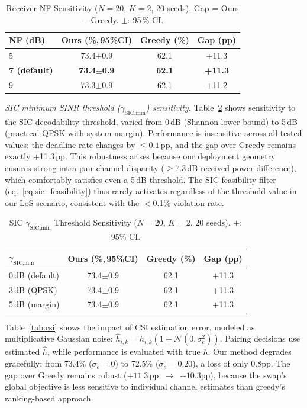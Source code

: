 \documentclass[journal]{IEEEtran}
\begin{document}
\begin{table}[h]
\centering
\caption{Receiver NF Sensitivity ($N=20$, $K=2$, 20 seeds). Gap = Ours $-$ Greedy. $\pm$: 95\,\% CI.}
\label{tab:nf}
\small
\begin{tabular}{lccc}
\toprule
NF (dB) & Ours (\%,\,95\%CI) & Greedy (\%) & Gap (pp) \\
\midrule
5 & 73.4$\pm$0.9 & 62.1 & +11.3 \\
\textbf{7 (default)} & \textbf{73.4$\pm$0.9} & \textbf{62.1} & \textbf{+11.3} \\
9 & 73.3$\pm$0.9 & 62.1 & +11.2 \\
\bottomrule
\end{tabular}
\end{table}

\emph{SIC minimum SINR threshold ($\gamma_{\text{SIC,min}}$) sensitivity.}
Table~\ref{tab:sic_threshold} shows sensitivity to the SIC decodability threshold, varied from 0\,dB (Shannon lower bound) to 5\,dB (practical QPSK with system margin).
Performance is insensitive across all tested values: the deadline rate changes by $\leq 0.1$\,pp, and the gap over Greedy remains exactly +11.3\,pp.
This robustness arises because our deployment geometry ensures strong intra-pair channel disparity ($\geq 7.3$\,dB received power difference), which comfortably satisfies even a 5\,dB threshold.
The SIC feasibility filter (eq.~\ref{eq:sic_feasibility}) thus rarely activates regardless of the threshold value in our LoS scenario, consistent with the $<$0.1\% violation rate.

\begin{table}[h]
\centering
\caption{SIC $\gamma_{\text{SIC,min}}$ Threshold Sensitivity ($N=20$, $K=2$, 20 seeds). $\pm$: 95\% CI.}
\label{tab:sic_threshold}
\small
\begin{tabular}{lccc}
\toprule
$\gamma_{\text{SIC,min}}$ & Ours (\%,\,95\%CI) & Greedy (\%) & Gap (pp) \\
\midrule
0\,dB (default) & 73.4$\pm$0.9 & 62.1 & +11.3 \\
3\,dB (QPSK) & 73.4$\pm$0.9 & 62.1 & +11.3 \\
5\,dB (margin) & 73.4$\pm$0.9 & 62.1 & +11.3 \\
\bottomrule
\end{tabular}
\end{table}


Table~\ref{tab:csi} shows the impact of CSI estimation error, modeled as multiplicative Gaussian noise: $\hat{h}_{i,k} = h_{i,k}(1 + \mathcal{N}(0, \sigma_e^2))$.
Pairing decisions use estimated $\hat{h}$, while performance is evaluated with true $h$.
Our method degrades gracefully: from 73.4\% ($\sigma_e=0$) to 72.5\% ($\sigma_e=0.20$), a loss of only 0.8pp.
The gap over Greedy remains robust ($+11.3$\,pp~$\to$~$+10.3$pp), because the swap's global objective is less sensitive to individual channel estimates than greedy's ranking-based approach.
\end{document}
